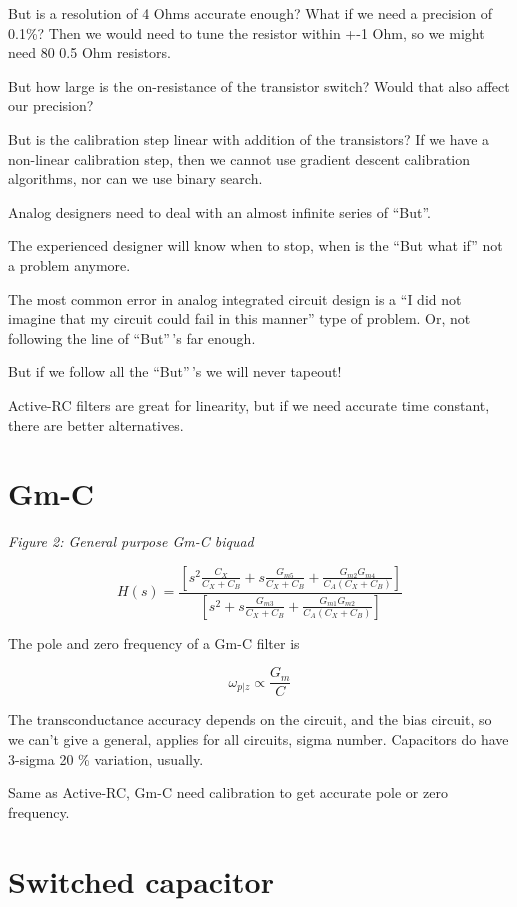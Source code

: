 But is a resolution of 4 Ohms accurate enough? What if we need a
precision of 0.1\%? Then we would need to tune the resistor within +-1
Ohm, so we might need 80 0.5 Ohm resistors.

But how large is the on-resistance of the transistor switch? Would that
also affect our precision?

But is the calibration step linear with addition of the transistors? If
we have a non-linear calibration step, then we cannot use gradient
descent calibration algorithms, nor can we use binary search.

Analog designers need to deal with an almost infinite series of ``But''.

The experienced designer will know when to stop, when is the ``But what
if'' not a problem anymore.

The most common error in analog integrated circuit design is a ``I did
not imagine that my circuit could fail in this manner'' type of problem.
Or, not following the line of ``But''\,'s far enough.

But if we follow all the ``But''\,'s we will never tapeout!

Active-RC filters are great for linearity, but if we need accurate time
constant, there are better alternatives.

\section{Gm-C}\label{gm-c}


{
\centering
{}
}

\emph{Figure 2: General purpose Gm-C biquad}

\[ H(s) = \frac{\left[ s^2\frac{C_X}{C_X + C_B} + s\frac{G_{m5}}{C_X + C_B} + \frac{G_{m2}G_{m4}}{C_A(C_X + C_B)}\right]}
{\left[s^2 + s\frac{G_{m3}}{C_X + C_B} + \frac{G_{m1}G_{m2}}{C_A(C_X + C_B)} \right]}\]

The pole and zero frequency of a Gm-C filter is

\[\omega_{p\vert z} \propto \frac{G_m}{C}\]

The transconductance accuracy depends on the circuit, and the bias
circuit, so we can't give a general, applies for all circuits, sigma
number. Capacitors do have 3-sigma 20 \% variation, usually.

Same as Active-RC, Gm-C need calibration to get accurate pole or zero
frequency.

\section{Switched capacitor}\label{switched-capacitor}


